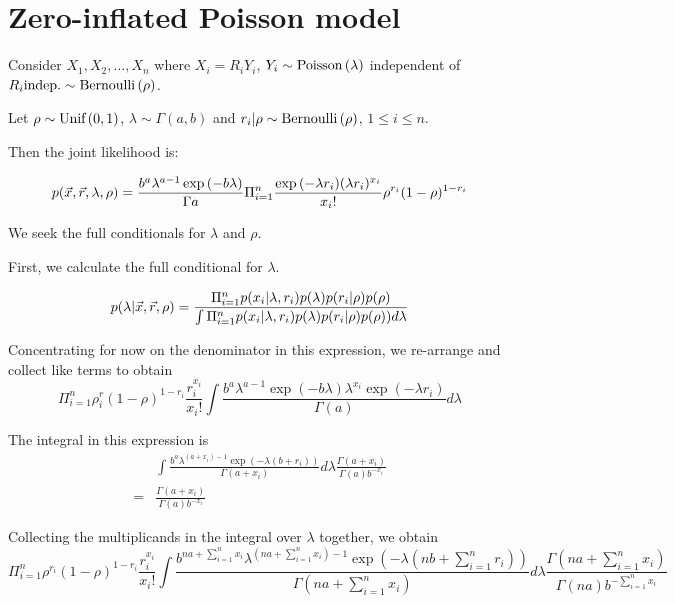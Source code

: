 \documentclass{amsart}
\begin{document}
\section{Zero-inflated Poisson model}
Consider $X_1, X_2, \ldots, X_n$ where $X_i = R_i Y_i$, $Y_i \sim \text{Poisson} \left( \lambda \right)$ independent of
$R_i \text{indep.} \sim \text{Bernoulli} \left( \rho \right)$.

Let $\rho \sim \text{Unif} \left( 0, 1 \right)$, $\lambda \sim \Gamma(a, b)$ and $r_i | \rho \sim \text{Bernoulli} \left( \rho \right)$, $1 \leq i \leq n$.

Then the joint likelihood is:

$$
p(\Vec{x}, \Vec{r}, \lambda, \rho) = \frac{b^a \lambda^{a - 1} \exp{(-b \lambda)}}{\Gamma{a}} \Pi_{i=1}^n \frac{\exp{(-\lambda r_i)} (\lambda r_i)^{x_i}}{x_i !} \rho^{r_i} (1 - \rho)^{1 - r_i}
$$

We seek the full conditionals for $\lambda$ and $\rho$.

First, we calculate the full conditional for $\lambda$.

\begin{align*}
p(\lambda|\Vec{x}, \Vec{r}, \rho) &= \frac{\Pi_{i=1}^n p(x_i | \lambda, r_i) p(\lambda) p(r_i|\rho) p(\rho)}{\int \Pi_{i=1}^n p(x_i | \lambda, r_i) p(\lambda) p(r_i|\rho) p(\rho)) d \lambda} \\
\end{align*}

Concentrating for now on the denominator in this expression, we re-arrange and collect
like terms to obtain
$$
\Pi_{i=1}^n \rho^r_i (1 - \rho)^{1 - r_i} \frac{r_i^{x_i}}{x_i !}
	\int \frac{b^a \lambda^{a - 1} \exp{(-b \lambda)} \lambda^{x_i} \exp{(-\lambda r_i)}}{\Gamma{(a)}} d \lambda
$$

The integral in this expression is
\begin{align*}
& \int \frac{b^a \lambda^{(a + x_i) - 1} \exp{(-\lambda(b + r_i))}}{\Gamma{(a + x_i)}} d \lambda \frac{\Gamma{(a+ x_i)}}{\Gamma{(a)} b^{-x_i}} \\
=& \frac{\Gamma{(a+ x_i)}}{\Gamma{(a)} b^{-x_i}}
\end{align*}

Collecting the multiplicands in the integral over $\lambda$ together, we obtain
$$
\Pi_{i=1}^n \rho^{r_i} (1 - \rho)^{1 - r_i} \frac{r_i^{x_i}}{x_i!}
	\int \frac{b^{na + \sum_{i=1}^n x_i} \lambda^{(na + \sum_{i=1}^n x_i) - 1} \exp{(-\lambda(nb + \sum_{i=1}^n r_i))}}{\Gamma{(na + \sum_{i=1}^n x_i)}} d \lambda
	\frac{\Gamma{(na + \sum_{i=1}^n x_i)}}{\Gamma{(na)} b^{-\sum_{i=1}^n x_i}}
$$
\end{document}
